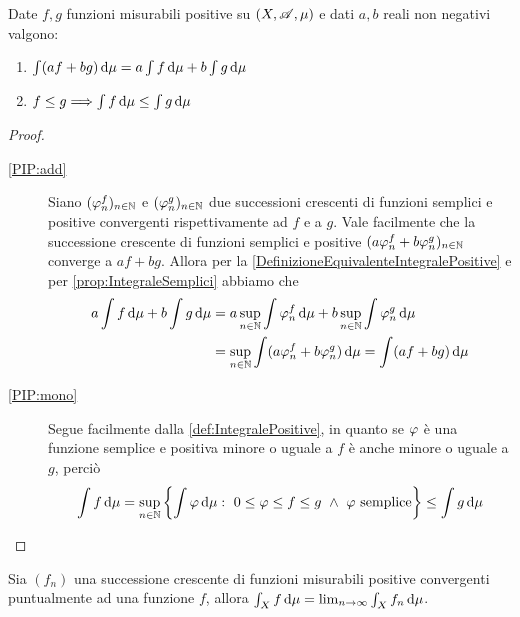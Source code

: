 \begin{proposition}\label{prop:IntegralePositive}
	Date $f,g$ funzioni misurabili positive su $(X,\mathscr A,\mu)$ e dati $a,b$ reali non negativi valgono:
	\begin{enumerate}
		\item $\int (af+bg)\,\mathrm d\mu=a\int f\,\mathrm d\mu+b\int g\,\mathrm d\mu$ \label{PIP:add}
		\item $f\le g\Longrightarrow \int f\,\mathrm d\mu\le \int g\,\mathrm d\mu$ \label{PIP:mono}
	\end{enumerate}
\end{proposition}
\begin{proof}
	\begin{description}
		\item[\ref{PIP:add}] Siano $(\varphi_n^f)_{n\in\mathbb N}$ e $(\varphi_n^g)_{n\in\mathbb N}$ due successioni crescenti di funzioni semplici e positive convergenti rispettivamente ad $f$ e a $g$. Vale facilmente che la successione crescente di funzioni semplici e positive $(a\varphi_n^f+b\varphi_n^g)_{n\in\mathbb N}$ converge a $af+bg$. Allora per la \cref{DefinizioneEquivalenteIntegralePositive} e per \cref{prop:IntegraleSemplici} abbiamo che
		\begin{equation*}
		\begin{split}
			a\int f\,\mathrm d\mu+b\int g\,\mathrm d\mu&=a\sup_{n\in\mathbb N}\int \varphi_n^f\,\mathrm d\mu+b\sup_{n\in\mathbb N}\int \varphi_n^g\,\mathrm d\mu \\
			&=\sup_{n\in\mathbb N}\int (a\varphi_n^f+b\varphi_n^g)\,\mathrm d\mu=\int (af+bg)\,\mathrm d\mu
		\end{split}
		\end{equation*}
		
		\item[\ref{PIP:mono}] Segue facilmente dalla \cref{def:IntegralePositive}, in quanto se $\varphi$ è una funzione semplice e positiva minore o uguale a $f$ è anche minore o uguale a $g$, perciò
		\begin{equation*}
		\int f\de\mu=\sup_{n\in\N}\left\{\int\simp\de \mu:\ 0\le \simp\le f\le g\ \wedge\ \simp \text{ semplice}\right\}\le \int g\de\mu
	\end{equation*}
	\end{description}
\end{proof}

\begin{theorem}\label{thm:BeppoLevi}
	Sia $(f_n)$ una successione crescente di funzioni misurabili positive convergenti puntualmente ad una funzione $f$, allora $\int_Xf\,\mathrm d\mu=\lim_{n\to\infty}\int_Xf_n\,\mathrm d\mu$.
\end{theorem}


